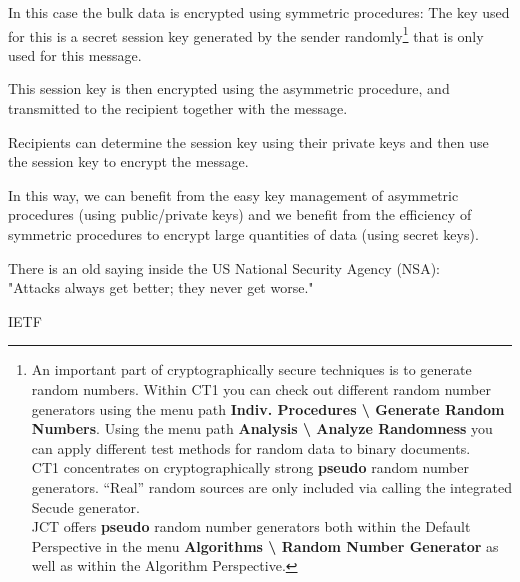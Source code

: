 In this case the bulk data is encrypted using symmetric procedures: The key
used for this is a secret session key generated by the
sender randomly\footnote{%
   An important part of cryptographically secure techniques is to generate 
   random numbers. Within CT1 you can check out
   different random number generators using the menu path
   {\bf Indiv. Procedures \textbackslash{} Generate Random Numbers}. 
   Using the menu path {\bf Analysis \textbackslash{} Analyze Randomness}
   you can apply different test methods for random data to binary documents. \\
   CT1 concentrates on cryptographically strong {\bf pseudo} random number
   generators. ``Real'' random sources are only included via calling the
   integrated Secude generator.\\
   JCT offers {\bf pseudo} random number generators both
   within the Default Perspective in the menu {\bf Algorithms \textbackslash{}
   Random Number Generator} as well as within the Algorithm Perspective.
}
that is only used for this message.

This session key is then encrypted using the asymmetric procedure, and
transmitted to the recipient together with the message.

Recipients can determine the session key using their private keys and
then use the session key to encrypt the message.

In this way, we can benefit from the easy key management
of asymmetric procedures (using public/private keys) and we benefit from the
efficiency of symmetric procedures to encrypt large quantities of data
(using secret keys).



\newpage

\begin{ctsquote}
    There is an old saying inside the US National Security Agency (NSA):\\
    "Attacks always get better; they never get worse."
\caption[IETF]{IETF\footnotemark}
\end{ctsquote}
\addtocounter{footnote}{0}

